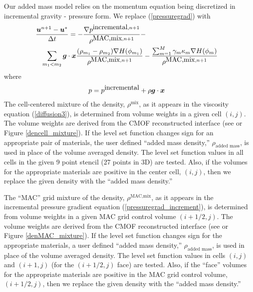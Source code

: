 \documentclass[]{article}
\newcommand{\bmg}{\mbox{\boldmath $g$\unboldmath}}
\newcommand{\bmu}{\mbox{\boldmath $u$\unboldmath}}
\newcommand{\bmx}{\mbox{\boldmath $x$\unboldmath}}
\begin{document}
Our added mass model relies on the momentum equation being 
discretized in incremental gravity - pressure form.  We replace
(\ref{pressuregrad}) with
\begin{eqnarray}
\lefteqn{ \frac{\bmu^{n+1}-\bmu^{\ast}}{\Delta t}=
 -\frac{\nabla p^{\mbox{incremental},n+1}}{\rho^{\mbox{MAC,mix},n+1}}- }
\nonumber   \\
& & \sum_{m_{1}<m_{2}} \bmg\cdot\bmx
\frac{(\rho_{m_{1}}-\rho_{m_{2}})\nabla H(\phi_{m_{1}})}
     {\rho^{\mbox{MAC,mix},n+1}}-
\frac{\sum_{m=1}^{M} \gamma_{m}\kappa_{m}\nabla H(\phi_{m})}
	{\rho^{\mbox{MAC,mix},n+1}} 
\label{pressuregrad_increment}
\end{eqnarray}
where 
\begin{eqnarray*}
p=p^{\mbox{incremental}}+\rho \bmg \cdot\bmx 
\end{eqnarray*}
The cell-centered
mixture of the density, $\rho^{\mbox{mix}}$, 
as it appears 
in the viscosity 
equation (\ref{diffusion3}), is determined from volume weights in a 
given cell $(i,j)$.  The
volume weights are derived from the CMOF
reconstructed interface (see \cite{pei2019hierarchical} or
Figure \ref{dencell_mixture}).
If the level set
function changes sign for an appropriate pair of materials, the
user defined ``added mass density,'' 
$\rho_{\mbox{added mass}}$,
is used in place of the
volume averaged density.  The level set function values in all
cells in the given 9 point stencil (27 points in 3D)
are tested.  Also, if the 
volumes for the appropriate materials are positive in the
center cell, $(i,j)$, then we replace the given density
with the ``added mass density.''

The ``MAC'' grid 
mixture of the density, $\rho^{\mbox{MAC,mix}}$, 
as it appears 
in the incremental pressure gradient 
equation (\ref{pressuregrad_increment}), 
is determined from volume weights in a 
given MAC grid control volume $(i+1/2,j)$.  The
volume weights are derived from the CMOF
reconstructed interface 
(see \cite{pei2019hierarchical,VAHAB2021} or 
Figure \ref{denMAC_mixture}). 
If the level set
function changes sign for the appropriate materials, a 
user defined ``added mass density,'' 
$\rho_{\mbox{added mass}}$,
is used in place of the
volume averaged density.  The level set function values in 
cells $(i,j)$ and $(i+1,j)$ (for the $(i+1/2,j)$ face)
are tested.  Also, if the 
``face'' volumes for the appropriate 
materials are positive in the MAC grid 
control volume, $(i+1/2,j)$,
then we replace the given density
with the ``added mass density.''
\end{document}

